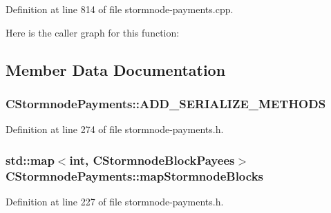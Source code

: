 Definition at line 814 of file stormnode-\/payments.\+cpp.



Here is the caller graph for this function\+:




\subsection{Member Data Documentation}
\hypertarget{class_c_stormnode_payments_aedb0752fb1e1cb758cfc2fd05d131c40}{}
\subsubsection[{A\+D\+D\+\_\+\+S\+E\+R\+I\+A\+L\+I\+Z\+E\+\_\+\+M\+E\+T\+H\+O\+D\+S}]{\setlength{\rightskip}{0pt plus 5cm}C\+Stormnode\+Payments\+::\+A\+D\+D\+\_\+\+S\+E\+R\+I\+A\+L\+I\+Z\+E\+\_\+\+M\+E\+T\+H\+O\+D\+S}\label{class_c_stormnode_payments_aedb0752fb1e1cb758cfc2fd05d131c40}


Definition at line 274 of file stormnode-\/payments.\+h.

\hypertarget{class_c_stormnode_payments_aad1a7055ea55caa06b4eb291e8b3a348}{}
\subsubsection[{map\+Stormnode\+Blocks}]{\setlength{\rightskip}{0pt plus 5cm}std\+::map$<$int, {\bf C\+Stormnode\+Block\+Payees}$>$ C\+Stormnode\+Payments\+::map\+Stormnode\+Blocks}\label{class_c_stormnode_payments_aad1a7055ea55caa06b4eb291e8b3a348}


Definition at line 227 of file stormnode-\/payments.\+h.

\hypertarget{class_c_stormnode_payments_a2227618f68b1655073c17d4b2ffe1c56}{}
